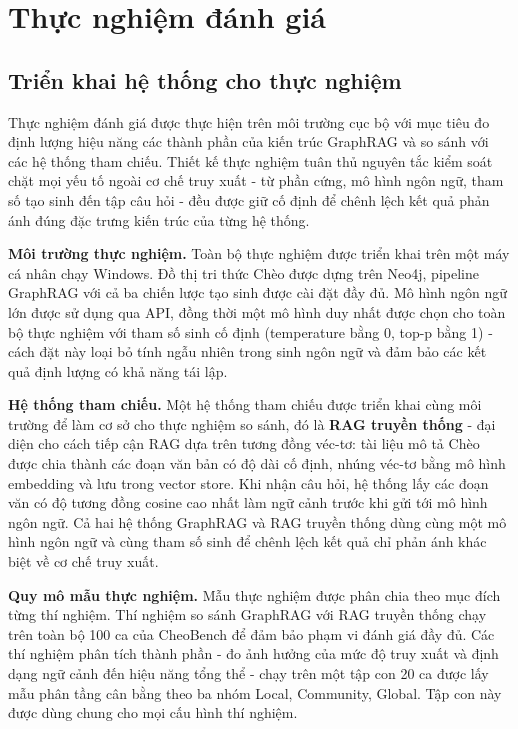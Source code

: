 
\section{Thực nghiệm đánh giá}
\label{sec:benchmark_experiments}

\subsection{Triển khai hệ thống cho thực nghiệm}
\label{sec:benchmark_setup}

Thực nghiệm đánh giá được thực hiện trên môi trường cục bộ với mục tiêu đo định lượng hiệu năng các thành phần của kiến trúc GraphRAG và so sánh với các hệ thống tham chiếu. Thiết kế thực nghiệm tuân thủ nguyên tắc kiểm soát chặt mọi yếu tố ngoài cơ chế truy xuất - từ phần cứng, mô hình ngôn ngữ, tham số tạo sinh đến tập câu hỏi - đều được giữ cố định để chênh lệch kết quả phản ánh đúng đặc trưng kiến trúc của từng hệ thống.

\textbf{Môi trường thực nghiệm.} Toàn bộ thực nghiệm được triển khai trên một máy cá nhân chạy Windows. Đồ thị tri thức Chèo được dựng trên Neo4j, pipeline GraphRAG với cả ba chiến lược tạo sinh được cài đặt đầy đủ. Mô hình ngôn ngữ lớn được sử dụng qua API, đồng thời một mô hình duy nhất được chọn cho toàn bộ thực nghiệm với tham số sinh cố định (temperature bằng 0, top-p bằng 1) - cách đặt này loại bỏ tính ngẫu nhiên trong sinh ngôn ngữ và đảm bảo các kết quả định lượng có khả năng tái lập.

\textbf{Hệ thống tham chiếu.} Một hệ thống tham chiếu được triển khai cùng môi trường để làm cơ sở cho thực nghiệm so sánh, đó là \textbf{RAG truyền thống} - đại diện cho cách tiếp cận RAG dựa trên tương đồng véc-tơ: tài liệu mô tả Chèo được chia thành các đoạn văn bản có độ dài cố định, nhúng véc-tơ bằng mô hình embedding và lưu trong vector store. Khi nhận câu hỏi, hệ thống lấy các đoạn văn có độ tương đồng cosine cao nhất làm ngữ cảnh trước khi gửi tới mô hình ngôn ngữ. Cả hai hệ thống GraphRAG và RAG truyền thống dùng cùng một mô hình ngôn ngữ và cùng tham số sinh để chênh lệch kết quả chỉ phản ánh khác biệt về cơ chế truy xuất.

\textbf{Quy mô mẫu thực nghiệm.} Mẫu thực nghiệm được phân chia theo mục đích từng thí nghiệm. Thí nghiệm so sánh GraphRAG với RAG truyền thống chạy trên toàn bộ 100 ca của CheoBench để đảm bảo phạm vi đánh giá đầy đủ. Các thí nghiệm phân tích thành phần - đo ảnh hưởng của mức độ truy xuất và định dạng ngữ cảnh đến hiệu năng tổng thể - chạy trên một tập con 20 ca được lấy mẫu phân tầng cân bằng theo ba nhóm Local, Community, Global. Tập con này được dùng chung cho mọi cấu hình thí nghiệm.

